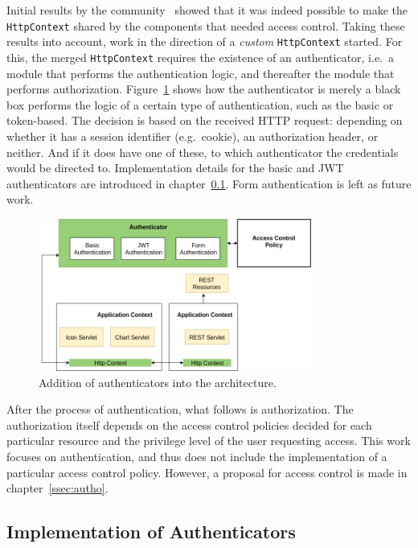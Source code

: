 \documentclass[12pt]{article}
\begin{document}
Initial results by the community~\cite{esh_03} showed that it was indeed possible to make the \texttt{HttpContext} shared by the components that needed access control. Taking these results into account, work in the direction of a \emph{custom} \texttt{HttpContext} started. For this, the merged \texttt{HttpContext} requires the existence of an authenticator, i.e.\ a module that performs the authentication logic, and thereafter the module that performs authorization. Figure~\ref{fig:esh_arch_authenticator} shows how the authenticator is merely a black box performs the logic of a certain type of authentication, such as the basic or token-based. The decision is based on the received HTTP request: depending on whether it has a session identifier (e.g.\ cookie), an authorization header, or neither. And if it does have one of these, to which authenticator the credentials would be directed to. Implementation details for the basic and JWT authenticators are introduced in chapter~\ref{ssec:impl}. Form authentication is left as future work. 

\begin{figure} [ht] 
\begin{center}
\includegraphics[width=0.8\textwidth]{esh_arch_authenticator}
\caption{Addition of authenticators into the architecture.}
\label{fig:esh_arch_authenticator}
\end{center}
\end{figure}

After the process of authentication, what follows is authorization. The authorization itself depends on the access control policies decided for each particular resource and the privilege level of the user requesting access. This work focuses on authentication, and thus does not include the implementation of a particular access control policy. However, a proposal for access control is made in chapter~\ref{ssec:autho}.

\subsection{Implementation of Authenticators}
\label{ssec:impl}
\end{document}

